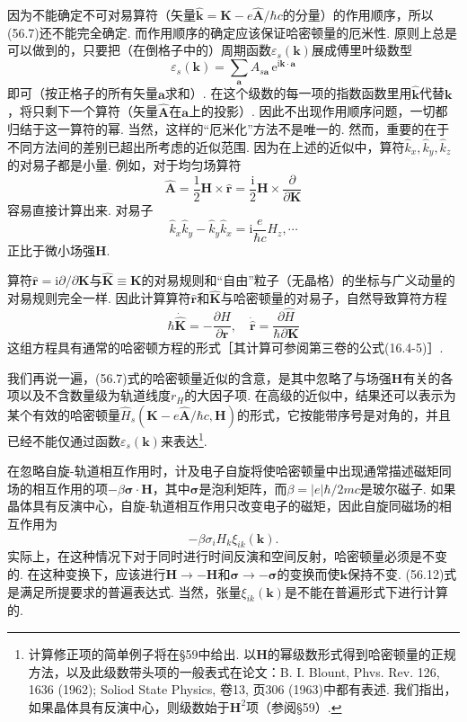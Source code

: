 因为不能确定不可对易算符（矢量$\hat{\bm k}=\bm K-e\hat{\bm A}/\hbar c$的分量）的作用顺序，所以(56.7)还不能完全确定. 而作用顺序的确定应该保证哈密顿量的厄米性. 原则上总是可以做到的，只要把（在倒格子中的）周期函数$\varepsilon_s(\bm k)$展成傅里叶级数型
\begin{equation}
\varepsilon_s(\bm k)=\sum_{\bm a}A_{s\bm a}\,\mathrm e^{\mathrm i\bm k\cdot\bm a}
\label{56.8}
\end{equation}
即可（按正格子的所有矢量$\bm a$求和）. 在这个级数的每一项的指数函数里用$\hat{\bm k}$代替$\bm k$，将只剩下一个算符（矢量$\hat{\bm A}$在$\bm a$上的投影）. 因此不出现作用顺序问题，一切都归结于这一算符的幂. 当然，这样的“厄米化”方法不是唯一的. 然而，重要的在于不同方法间的差别已超出所考虑的近似范围. 因为在上述的近似中，算符$\hat k_x,\hat k_y,\hat k_z$的对易子都是小量. 例如，对于均匀场算符
\begin{equation}
\hat{\bm A}=\frac{1}{2}\bm H\times\hat{\bm r}
=\frac{\mathrm i}{2}\bm H\times\frac{\partial}{\partial\bm K}
\label{56.9}
\end{equation}
容易直接计算出来. 对易子
\begin{equation}
\hat k_x\hat k_y-\hat k_y\hat k_x=\mathrm i\frac{e}{\hbar c}H_z,\cdots
\label{56.10}
\end{equation}
正比于微小场强$\bm H$.

算符$\hat{\bm r}=\mathrm i\partial/\partial\bm K$与$\hat{\bm K}\equiv\bm K$的对易规则和“自由”粒子（无晶格）的坐标与广义动量的对易规则完全一样. 因此计算算符$\hat{\bm r}$和$\hat{\bm K}$与哈密顿量的对易子，自然导致算符方程
\begin{equation}
\hbar\dot{\hat{\bm K}}=-\frac{\partial\hat H}{\partial\hat{\bm r}},\quad
\dot{\hat{\bm r}}=\frac{\partial\hat H}{\hbar\partial\bm K}
\label{56.11}
\end{equation}
这组方程具有通常的哈密顿方程的形式［其计算可参阅第三卷的公式(16.4-5)］.

我们再说一遍，(56.7)式的哈密顿量近似的含意，是其中忽略了与场强$\bm H$有关的各项以及不含数量级为轨道线度$r_H$的大因子项. 在高级的近似中，结果还可以表示为某个有效的哈密顿量$\hat H_s(\bm K-e\hat{\bm A}/\hbar c,\bm H)$的形式，它按能带序号是对角的，并且已经不能仅通过函数$\varepsilon_s(\bm k)$来表达\footnote{计算修正项的简单例子将在§59中给出. 以$\bm H$的幂级数形式得到哈密顿量的正规方法，以及此级数带头项的一般表式在论文：B. I. Blount, Phvs. Rev. 126, 1636 (1962); Soliod State Physics, 卷13, 页306 (1963)中都有表述. 我们指出，如果晶体具有反演中心，则级数始于$\bm H^2$项（参阅§59）.}.

在忽略自旋-轨道相互作用时，计及电子自旋将使哈密顿量中出现通常描述磁矩同场的相互作用的项$-\beta\bm\sigma\cdot\bm H$，其中$\bm\sigma$是泡利矩阵，而$\beta=|e|\hbar/2mc$是玻尔磁子. 如果晶体具有反演中心，自旋-轨道相互作用只改变电子的磁矩，因此自旋同磁场的相互作用为
\begin{equation}
-\beta\sigma_iH_k\xi_{ik}(\bm k).
\label{56.12}
\end{equation}
实际上，在这种情况下对于同时进行时间反演和空间反射，哈密顿量必须是不变的. 在这种变换下，应该进行$\bm H\to-\bm H$和$\bm\sigma\to-\bm\sigma$的变换而使$\bm k$保持不变. (56.12)式是满足所提要求的普遍表达式. 当然，张量$\xi_{ik}(\bm k)$是不能在普遍形式下进行计算的.

